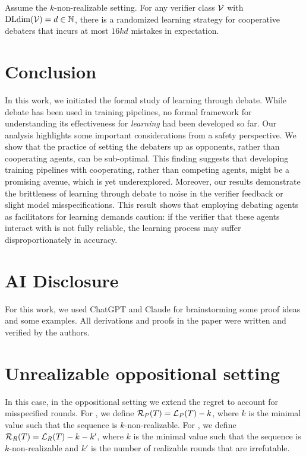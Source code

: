 \documentclass[anon]{alt2027} %
\begin{document}
\begin{theorem}\label{thm:upperkd}
    Assume the $k$-non-realizable setting. For any verifier class ${\mathcal V}$ with $\mathrm{DLdim}({\mathcal V}) = d \in \mathbb{N}$, there is a randomized learning strategy for cooperative debaters that incurs at most $16kd$ mistakes in expectation. 
\end{theorem}


\section{Conclusion}

In this work, we initiated the formal study of learning through debate. While debate has been used in training pipelines, no formal framework for understanding its effectiveness for \emph{learning} had been developed so far. Our analysis highlights some important considerations from a safety perspective. We show that the practice of setting the debaters up as opponents, rather than cooperating agents, can be sub-optimal. 
This finding suggests that developing training pipelines with cooperating, rather than competing agents, might be a promising avenue, which is yet underexplored.
Moreover, our results demonstrate the brittleness of learning through debate to noise in the verifier feedback or slight model misspecifications. This result shows that employing debating agents as facilitators for learning demands caution: if the verifier that these agents interact with is not fully reliable, the learning process may suffer disproportionately in accuracy.

\section*{AI Disclosure}

For this work, we used ChatGPT and Claude for brainstorming some proof ideas and some examples. All derivations and proofs in the paper were written and verified by the authors.


\iffalse
\section{Unrealizable oppositional setting }

In this case, in the oppositional setting we extend the regret to account for misspecified rounds. For \dt, we define ${{\mathcal R}_P}(T) = {{\mathcal L}_P}(T) - k$, where $k$ is the minimal value such that the sequence is $k$-non-realizable. For \df, we define 
${{\mathcal R}_R}(T) = {{\mathcal L}_R}(T) - k - k'$, where $k$ is the minimal value such that the sequence is $k$-non-realizable and $k'$ is the number of realizable rounds that are irrefutable. 
\end{document}
